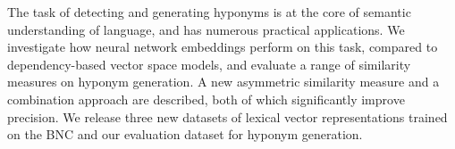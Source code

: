 The task of detecting and generating hyponyms is at the core of semantic understanding of language, and has numerous practical applications. We investigate how neural network embeddings perform on this task, compared to dependency-based vector space models, and evaluate a range of similarity measures on hyponym generation. A new asymmetric similarity measure and a combination approach are described, both of which significantly improve precision. We release three new datasets of lexical vector representations trained on the BNC and our evaluation dataset for hyponym generation.
